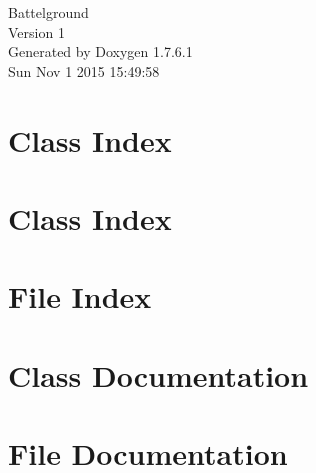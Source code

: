 \documentclass[a4paper]{book}
\begin{document}
\hypersetup{pageanchor=false,citecolor=blue}
\begin{titlepage}
\vspace*{7cm}
\begin{center}
{\Large \-Battelground \\[1ex]\large \-Version 1 }\\
\vspace*{1cm}
{\large \-Generated by Doxygen 1.7.6.1}\\
\vspace*{0.5cm}
{\small Sun Nov 1 2015 15:49:58}\\
\end{center}
\end{titlepage}
\clearemptydoublepage
{}
\tableofcontents
\clearemptydoublepage
{}
\hypersetup{pageanchor=true,citecolor=blue}
\chapter{\-Class \-Index}

\chapter{\-Class \-Index}

\chapter{\-File \-Index}

\chapter{\-Class \-Documentation}



















\chapter{\-File \-Documentation}



















\printindex
\end{document}
